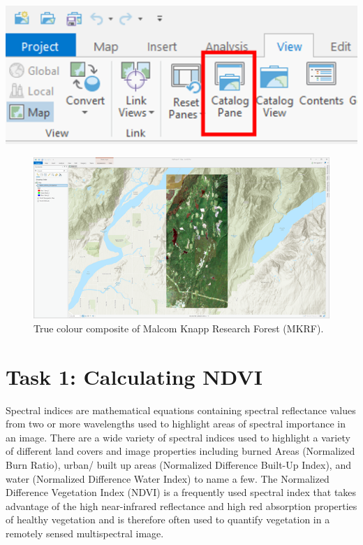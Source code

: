 \documentclass[
]{book}
\begin{document}
\begin{center}\includegraphics[width=0.5\linewidth]{images/01-catalog-pane} \end{center}

\begin{figure}

{\centering \includegraphics[width=1\linewidth]{images/07-true-colour-composite-mkrf} 

}

\caption{True colour composite of Malcom Knapp Research Forest (MKRF).}\label{fig:07-true-colour-composite-mkrf}
\end{figure}

\hypertarget{task-1-calculating-ndvi}{%
\section*{Task 1: Calculating NDVI}\label{task-1-calculating-ndvi}}

Spectral indices are mathematical equations containing spectral reflectance values from two or more wavelengths used to highlight areas of spectral importance in an image. There are a wide variety of spectral indices used to highlight a variety of different land covers and image properties including burned Areas (Normalized Burn Ratio), urban/ built up areas (Normalized Difference Built-Up Index), and water (Normalized Difference Water Index) to name a few. The Normalized Difference Vegetation Index (NDVI) is a frequently used spectral index that takes advantage of the high near-infrared reflectance and high red absorption properties of healthy vegetation and is therefore often used to quantify vegetation in a remotely sensed multispectral image.
\end{document}
